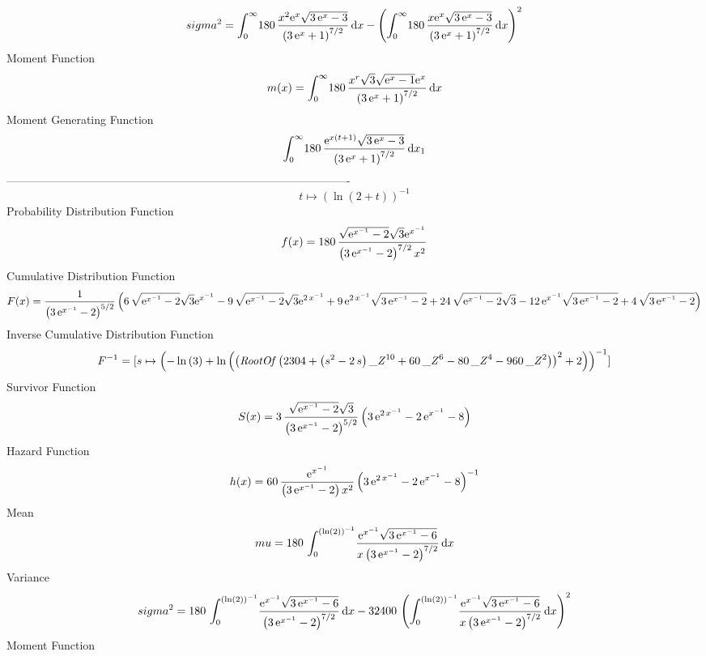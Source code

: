 \documentclass[12pt]{article}
\begin{document}
 $$ sigma^2 = \int_{0}^{\infty }\!180\,{\frac {{x}^{2}{{\rm e}^{x}}\sqrt {3\,{
{\rm e}^{x}}-3}}{ \left( 3\,{{\rm e}^{x}}+1 \right) ^{7/2}}}\,{\rm d}x
- \left( \int_{0}^{\infty }\!180\,{\frac {x{{\rm e}^{x}}\sqrt {3\,{
{\rm e}^{x}}-3}}{ \left( 3\,{{\rm e}^{x}}+1 \right) ^{7/2}}}\,{\rm d}x
 \right) ^{2}
$$Moment Function 
 $$ m(x) = \int_{0}^{\infty }\!180\,{\frac {{x}^{r}\sqrt {3}\sqrt {{{\rm e}^{x}}-
1}{{\rm e}^{x}}}{ \left( 3\,{{\rm e}^{x}}+1 \right) ^{7/2}}}\,{\rm d}x
$$ Moment Generating Function 
 $$\int_{0}^{\infty }\!180\,{\frac {{{\rm e}^{x \left( t+1 \right) }}
\sqrt {3\,{{\rm e}^{x}}-3}}{ \left( 3\,{{\rm e}^{x}}+1 \right) ^{7/2}}
}\,{\rm d}x_{{1}}
$$-------------------------------------------------------------------------------------------  \\$$t\mapsto  \left( \ln  \left( 2+t \right)  \right) ^{-1}
$$Probability Distribution Function 
$$  f(x)=180\,{\frac {\sqrt {{{\rm e}^{{x}^{-1}}}-2}\sqrt {3}{{\rm e}^{{x}^{-1}
}}}{ \left( 3\,{{\rm e}^{{x}^{-1}}}-2 \right) ^{7/2}{x}^{2}}}
$$Cumulative Distribution Function  
 $$F(x)={\frac {1}{ \left( 3\,{{\rm e}^{{x}^{-1}}}-2 \right) ^{5/2}} \left( 6
\,\sqrt {{{\rm e}^{{x}^{-1}}}-2}\sqrt {3}{{\rm e}^{{x}^{-1}}}-9\,
\sqrt {{{\rm e}^{{x}^{-1}}}-2}\sqrt {3}{{\rm e}^{2\,{x}^{-1}}}+9\,{
{\rm e}^{2\,{x}^{-1}}}\sqrt {3\,{{\rm e}^{{x}^{-1}}}-2}+24\,\sqrt {{
{\rm e}^{{x}^{-1}}}-2}\sqrt {3}-12\,{{\rm e}^{{x}^{-1}}}\sqrt {3\,{
{\rm e}^{{x}^{-1}}}-2}+4\,\sqrt {3\,{{\rm e}^{{x}^{-1}}}-2} \right) }
$$ Inverse Cumulative Distribution Function 
  $$F^{-1} = [s\mapsto  \left( -\ln  \left( 3 \right) +\ln  \left(  \left( {\it 
RootOf} \left( 2304+ \left( {s}^{2}-2\,s \right) {{\it \_Z}}^{10}+60\,
{{\it \_Z}}^{6}-80\,{{\it \_Z}}^{4}-960\,{{\it \_Z}}^{2} \right) 
 \right) ^{2}+2 \right)  \right) ^{-1}]
$$Survivor Function 
 $$ S(x)=3\,{\frac {\sqrt {{{\rm e}^{{x}^{-1}}}-2}\sqrt {3}}{ \left( 3\,{
{\rm e}^{{x}^{-1}}}-2 \right) ^{5/2}} \left( 3\,{{\rm e}^{2\,{x}^{-1}}
}-2\,{{\rm e}^{{x}^{-1}}}-8 \right) }
$$ Hazard Function 
 $$ h(x)=60\,{\frac {{{\rm e}^{{x}^{-1}}}}{ \left( 3\,{{\rm e}^{{x}^{-1}}}-2
 \right) {x}^{2}} \left( 3\,{{\rm e}^{2\,{x}^{-1}}}-2\,{{\rm e}^{{x}^{
-1}}}-8 \right) ^{-1}}
$$Mean 
 $$ mu=180\,\int_{0}^{ \left( \ln  \left( 2 \right)  \right) ^{-1}}\!{\frac {
{{\rm e}^{{x}^{-1}}}\sqrt {3\,{{\rm e}^{{x}^{-1}}}-6}}{x \left( 3\,{
{\rm e}^{{x}^{-1}}}-2 \right) ^{7/2}}}\,{\rm d}x
$$ Variance 
 $$ sigma^2 = 180\,\int_{0}^{ \left( \ln  \left( 2 \right)  \right) ^{-1}}\!{\frac {
{{\rm e}^{{x}^{-1}}}\sqrt {3\,{{\rm e}^{{x}^{-1}}}-6}}{ \left( 3\,{
{\rm e}^{{x}^{-1}}}-2 \right) ^{7/2}}}\,{\rm d}x-32400\, \left( \int_{0
}^{ \left( \ln  \left( 2 \right)  \right) ^{-1}}\!{\frac {{{\rm e}^{{x
}^{-1}}}\sqrt {3\,{{\rm e}^{{x}^{-1}}}-6}}{x \left( 3\,{{\rm e}^{{x}^{
-1}}}-2 \right) ^{7/2}}}\,{\rm d}x \right) ^{2}
$$Moment Function 
\end{document}
